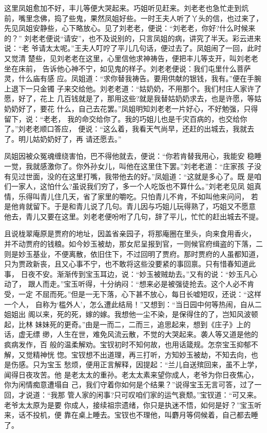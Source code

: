 这里凤姐愈加不好，丰儿等便大哭起来。巧姐听见赶来。刘老老也急忙走到炕
前，嘴里念佛，捣了些鬼，果然凤姐好些。一时王夫人听了丫头的信，也过来了，
先见凤姐安静些，心下略放心。见了刘老老，便说：“刘老老，你好?什么时候来的？”
刘老老便说“请安”，也不及说别的，只言凤姐的病，讲究了半天。彩云进来说：“老
爷请太太呢。”王夫人叮咛了平儿几句话，便过去了。凤姐闹了一回，此时又觉清
楚些，见刘老老在这里，心里信他求神祷告，便把丰儿等支开，叫刘老老坐在床前，
告诉他心神不宁，如见鬼的样子。刘老老便说：我们屯里什么菩萨灵，什么庙有感
应。凤姐道：“求你替我祷告。要用供献的银钱，我有。”便在手腕上退下一只金镯
子来交给他。刘老老道：“姑奶奶，不用那个。我们村庄人家许了愿，好了，花上
几百钱就是了，那用这些?就是我替姑奶奶求去，也是许愿，等姑奶奶好了，要花
什么，自己去花罢。”凤姐明知刘老老一片好心，不好勉强，只得留下，说：“老老，
我的命交给你了。我的巧姐儿也是千灾百病的，也交给你了。”刘老老顺口答应，
便说：“这么着，我看天气尚早，还赶的出城去，我就去了。明儿姑奶奶好了，再
请还愿去。”

凤姐因被众冤魂缠绕害怕，巴不得他就去，便说：“你若肯替我用心，我能安
稳睡一觉，我就感激你了。你外孙女儿，叫他在这里住下罢。”刘老老道：“庄家孩
子没有见过世面，没的在这里打嘴，我带他去的好。”凤姐道：“这就是多心了。既
是咱们一家人，这怕什么?虽说我们穷了，多一个人吃饭也不算什么。”刘老老见凤
姐真情，乐得叫青儿住几天，省了家里的嚼吃。只怕青儿不肯，不如叫他来问问，
若是他肯就留下。于是和青儿说了几句。青儿因与巧姐儿玩得熟了，巧姐又不愿意
他去，青儿又要在这里。刘老老便吩咐了几句，辞了平儿，忙忙的赶出城去不提。

且说栊翠庵原是贾府的地址，因盖省亲园子，将那庵圈在里头，向来食用香火，
并不动贾府的钱粮。如今妙玉被劫，那女尼呈报到官，一则候官府缉盗的下落，二
则是妙玉基业，不便离散，依旧住下，不过回明了贾府。那时贾府的人虽都知道，
只为贾政新丧，且又心事不宁，也不敢将这些没要紧的事回禀。只有惜春知道此事，
日夜不安。渐渐传到宝玉耳边，说：“妙玉被贼劫去。”又有的说：“妙玉凡心动了，
跟人而走。”宝玉听得，十分纳闷：“想来必是被强徒抢去。这个人必不肯受，一定
不屈而死。”但是一无下落，心下甚不放心，每日长嘘短叹，还说：“这样一个人，
自称为‘槛外人’，怎么遭此结局！”又想到：“当日园中何等热闹，自从二姐姐出
阁以来，死的死，嫁的嫁。我想他一尘不染，是保得住的了，岂知风波顿起，比林
妹妹死的更奇。”由是一而二，二而三，追思起来，想到《庄子》上的话，虚无缥
缈，人生在世，难免风流云散，不觉的大哭起来。袭人等又道是他的疯病发作，百
般的温柔解劝。宝钗初时不知何故，也用话箴规。怎奈宝玉抑郁不解，又觉精神恍
惚。宝钗想不出道理，再三打听，方知妙玉被劫，不知去向，也是伤感。只为宝玉
愁烦，便用正言解释，因提起：“兰儿自送殡回来，虽不上学，闻得日夜攻苦。他
是老太太的重孙。老太太素来望你成人，老爷为你日夜焦心，你为闲情痴意遭塌自
己，我们守着你如何是个结果？”说得宝玉无言可答，过了一回，才说道：“我那
管人家的闲事?只可叹咱们家的运气衰颓。”宝钗道：“可又来。老爷太太原为是要
你成人，接续祖宗遗绪，你只是执迷不悟，如何是好？”宝玉听来，话不投机，便
靠在桌上睡去。宝钗也不理他，叫麝月等伺候着，自己都去睡了。

